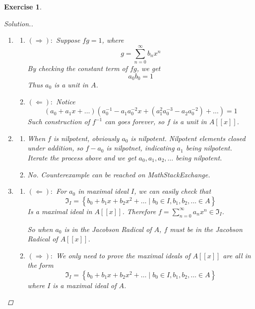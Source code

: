\documentclass{article}
\theoremstyle{breakstyle}
\newtheorem{exercise}{Exercise}
\newenvironment{solution}
  {\begin{proof}[Solution.]\renewcommand{\qedsymbol}{}}
  {\end{proof}}
\begin{document}
\begin{exercise}
\begin{solution}
    \begin{enumerate}[label=({\roman*})]
            \item 
                \begin{enumerate}[label=({\alph*})]
                    \item $(\Rightarrow):$ Suppose $fg=1$, where
                        $$
                        g=\sum_{n=0}^{\infty} b_{n}x^{n} 
                        $$
                        By checking the constant term of $fg$, we get
                        $$
                        a_0b_0=1
                        $$
                        Thus $a_0$ is a unit in $A$.
                    \item $(\Leftarrow):$ Notice
                        $$
                        (a_0+a_1x+\ldots )(a_0^{-1}-a_1a_0^{-2}x+(a_1^2a_0^{-3}-a_2a_0^{-2})+\ldots )=1
                        $$
                        Such construction of $f^{-1}$ can goes forever, so $f$ is a unit in $A[[x]]$.
                \end{enumerate}
            \item 
                \begin{enumerate}[label=({\alph*})]
                    \item When $f$ is nilpotent, obviously $a_0$ is nilpotent.
                        Nilpotent elements closed under addition, so $f-a_0$ is nilpotnet, indicating $a_1$ being nilpotent.
                        Iterate the process above and we get $a_0,a_1,a_2,\ldots $ being nilpotent.
                    \item No. Counterexample can be reached on \emph{MathStackExchange}.
                \end{enumerate}
            \item 
                \begin{enumerate}[label=({\alph*})]
                    \item $(\Leftarrow):$
                        For $a_0$ in maximal ideal $I$, we can easily check that
                        $$
                        \mathfrak{I}_{I}=\left\{ b_0+b_1x+b_2x^2+\ldots \mid b_0\in I,b_1,b_2,\ldots \in A \right\} 
                        $$
                        Is a maximal ideal in $A[[x]]$.
                        Therefore $f=\sum_{n=0}^{\infty} a_{n}x^{n}\in \mathfrak{I}_{I} $.

                        So when $a_0$ is in the Jacobson Radical of $A$, $f$ must be in the Jacobson Radical of $A[[x]]$.
                     \item $(\Rightarrow):$
                         We only need to prove the maximal ideals of $A[[x]]$ are all in the form
                         $$
                        \mathfrak{I}_{I}=\left\{ b_0+b_1x+b_2x^2+\ldots \mid b_0\in I,b_1,b_2,\ldots \in A \right\} 
                         $$
                         where $I$ is a maximal ideal of $A$.


\end{enumerate}
\end{enumerate}
\end{solution}
\end{exercise}
\end{document}
